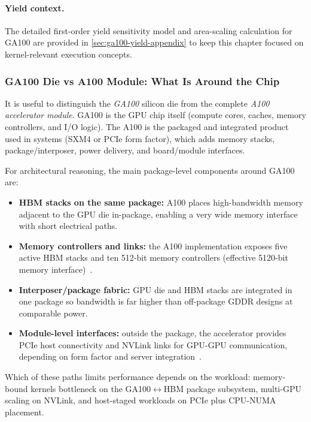 \paragraph{Yield context.}
The detailed first-order yield sensitivity model and area-scaling calculation
for GA100 are provided in \cref{sec:ga100-yield-appendix} to keep this chapter
focused on kernel-relevant execution concepts.

\subsubsection{GA100 Die vs A100 Module: What Is Around the Chip}
\label{sec:ga100-vs-a100-module}

It is useful to distinguish the \emph{GA100} silicon die from the complete
\emph{A100 accelerator module}. GA100 is the GPU chip itself (compute cores,
caches, memory controllers, and I/O logic). The A100 is the packaged and
integrated product used in systems (SXM4 or PCIe form factor), which adds
memory stacks, package/interposer, power delivery, and board/module interfaces.

For architectural reasoning, the main package-level components
around GA100 are:
\begin{itemize}
  \item \textbf{HBM stacks on the same package:} A100 places high-bandwidth
  memory adjacent to the GPU die in-package, enabling a very wide memory
  interface with short electrical paths.
  \item \textbf{Memory controllers and links:} the A100 implementation exposes
  five active HBM stacks and ten 512-bit memory controllers (effective
  5120-bit memory interface)~\cite{nvidia-ampere-in-depth,nvidia2020a100}.
  \item \textbf{Interposer/package fabric:} GPU die and HBM stacks are
  integrated in one package so bandwidth is far higher than off-package GDDR
  designs at comparable power.
  \item \textbf{Module-level interfaces:} outside the package, the accelerator
  provides PCIe host connectivity and NVLink links for GPU-GPU communication,
  depending on form factor and server integration~\cite{nvidia-a100-product-specs}.
\end{itemize}

Which of these paths limits performance depends on the workload: memory-bound
kernels bottleneck on the GA100$\leftrightarrow$HBM package subsystem,
multi-GPU scaling on NVLink, and host-staged workloads on PCIe plus
CPU-NUMA placement.

